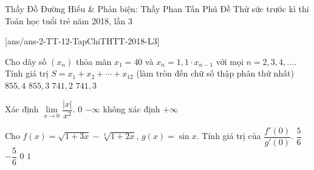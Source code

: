\begin{name}
{Thầy Đỗ Đường Hiếu \& Phản biện: Thầy Phan Tấn Phú}
{Đề Thử sức trước kì thi Toán học tuổi trẻ năm 2018, lần 3}
\end{name}
\setcounter{ex}{0}\setcounter{bt}{0}
[ans/ans-2-TT-12-TapChiTHTT-2018-L3]

\begin{ex}%
Cho dãy số $(x_n)$ thỏa mãn $x_1=40$ và $x_n=1{,}1\cdot x_{n-1}$ với mọi $n=2,3,4,...$. Tính giá trị $S=x_1+x_2+\cdots+x_{12}$ (làm tròn đến chữ số thập phân thứ nhất)
\choice
{\True $855{,}4$}
{$855{,}3$}
{$741{,}2$}
{$741{,}3$}
\end{ex}

\begin{ex}%
Xác định $\lim\limits_{x\rightarrow 0}\dfrac{\left|x\right|}{x^2}$.
\choice
{$0$}
{$-\infty $}
{không xác định}
{\True $+\infty $}
\end{ex}

\begin{ex}%
Cho $f(x)=\sqrt{1+3x}-\sqrt[3]{1+2x}$, $g(x)=\sin x$. Tính giá trị của $\dfrac{f'(0)}{g'(0)}$.
\choice
{\True $\dfrac{5}{6}$}
{$-\dfrac{5}{6}$}
{$0$}
{$1$}
\end{ex}

